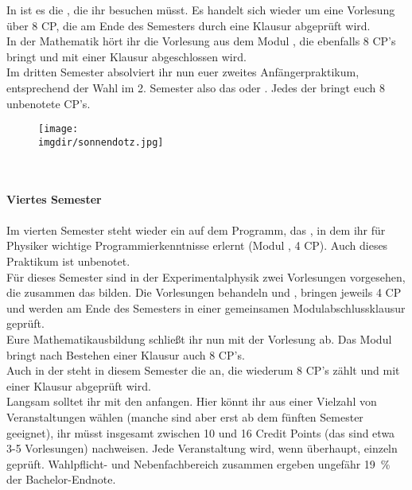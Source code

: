 In  ist es die , die ihr besuchen müsst.
Es handelt sich wieder um eine Vorlesung über 8 CP, die am Ende des Semesters durch eine Klausur abgeprüft wird.\\
In der Mathematik hört ihr die Vorlesung  aus dem Modul , die ebenfalls 8 CP's bringt und mit einer Klausur abgeschlossen wird.\\
Im dritten Semester absolviert ihr nun euer zweites Anfängerpraktikum, entsprechend der Wahl im 2. Semester also das  oder .
Jedes der  bringt euch 8 unbenotete CP's.
\begin{figure}[p]
  	\texttt{[image: \\imgdir/sonnendotz.jpg]}
\end{figure}
\\\\\hspace*{\fill}\textbf{Viertes Semester}\hspace*{\fill}\\\\
Im vierten Semester steht wieder ein  auf dem Programm, das , in dem ihr für Physiker wichtige Programmierkenntnisse erlernt (Modul , 4 CP). Auch dieses Praktikum ist unbenotet.\\
Für dieses Semester sind in der Experimentalphysik zwei Vorlesungen vorgesehen, die zusammen das  bilden. Die Vorlesungen behandeln  und , bringen jeweils 4 CP und werden am Ende des Semesters in einer gemeinsamen Modulabschlussklausur geprüft.\\
Eure Mathematikausbildung schlie\ss t ihr nun mit der Vorlesung  ab. Das Modul  bringt nach Bestehen einer Klausur auch 8 CP's.\\
Auch in der  steht in diesem Semester die  an, die wiederum 8 CP's zählt und mit einer Klausur abgeprüft wird.\\
Langsam solltet ihr mit den \label{Wahlpflicht} anfangen. Hier könnt ihr aus einer Vielzahl von Veranstaltungen wählen (manche sind aber erst ab dem fünften Semester geeignet), ihr müsst insgesamt zwischen 10 und 16 Credit Points (das sind etwa 3-5 Vorlesungen) nachweisen. Jede Veranstaltung wird, wenn überhaupt, einzeln geprüft. Wahlpflicht- und Nebenfachbereich zusammen ergeben ungefähr 19~\% der Bachelor-Endnote.\\
